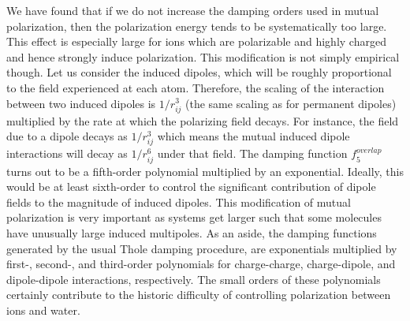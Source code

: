 \documentclass[journal=jacsat,manuscript=article]{achemso}
\begin{document}
We have found that if we do not increase the damping orders used in mutual polarization, then
the polarization energy tends to be systematically too large. This effect is especially large for ions
which are polarizable and highly charged and hence strongly induce polarization. This modification
is not simply empirical though. Let us consider the induced dipoles, which will be roughly
proportional to the field experienced at each atom. Therefore, the scaling of the interaction between
two induced dipoles is $1/r_{ij}^3$ (the same scaling as for permanent dipoles) multiplied by 
the rate at which the polarizing field decays.
For instance, the field due to a dipole decays as $1/r_{ij}^3$ which means the
mutual induced dipole interactions will decay as $1/r_{ij}^6$ under that field. The damping
function $f_5^{overlap}$ turns out to be a fifth-order polynomial multiplied by an exponential.
Ideally, this would be at least sixth-order to control the significant contribution of dipole
fields to the magnitude of induced dipoles. This modification of mutual polarization is very important
as systems get larger such that some molecules have unusually large induced multipoles. As an aside,
the damping functions generated by the usual Thole damping procedure\cite{thole1981molecular},
are exponentials multiplied by first-, second-, and third-order polynomials
for charge-charge, charge-dipole, and dipole-dipole interactions, respectively.\cite{thole1981molecular} The small orders
of these polynomials certainly contribute to the historic difficulty of controlling
polarization between ions and water.\cite{jiao2006simulation,mason2012accurate}
\end{document}
